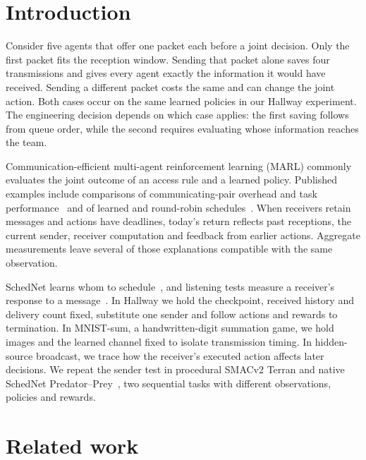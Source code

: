 \documentclass[pdflatex,sn-mathphys-num]{sn-jnl}
\begin{document}
\section{Introduction}
Consider five agents that offer one packet each before a joint decision. Only the first packet fits the reception window. Sending that packet alone saves four transmissions and gives every agent exactly the information it would have received. Sending a different packet costs the same and can change the joint action. Both cases occur on the same learned policies in our Hallway experiment. The engineering decision depends on which case applies: the first saving follows from queue order, while the second requires evaluating whose information reaches the team.

Communication-efficient multi-agent reinforcement learning (MARL) commonly evaluates the joint outcome of an access rule and a learned policy. Published examples include comparisons of communicating-pair overhead and task performance~\citep{zhang2019efficient,zhang2020succinct} and of learned and round-robin schedules~\citep{kim2019schedule}. When receivers retain messages and actions have deadlines, today's return reflects past receptions, the current sender, receiver computation and feedback from earlier actions. Aggregate measurements leave several of those explanations compatible with the same observation.

SchedNet learns whom to schedule~\citep{kim2019schedule}, and listening tests measure a receiver's response to a message~\citep{lowe2019pitfalls}. In Hallway we hold the checkpoint, received history and delivery count fixed, substitute one sender and follow actions and rewards to termination. In MNIST-sum, a handwritten-digit summation game, we hold images and the learned channel fixed to isolate transmission timing. In hidden-source broadcast, we trace how the receiver's executed action affects later decisions. We repeat the sender test in procedural SMACv2 Terran and native SchedNet Predator--Prey~\citep{ellis2023smacv2,kim2019schedule}, two sequential tasks with different observations, policies and rewards.

\section{Related work}\label{sec:related}
\end{document}
